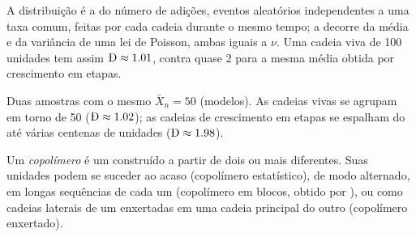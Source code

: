 \admitted

A distribuição é a do número de adições, eventos aleatórios independentes a uma taxa comum, feitas por
cada cadeia durante o mesmo tempo; a  decorre da média e da variância de uma lei de Poisson,
ambas iguais a $\nu$. Uma cadeia viva de 100 unidades tem assim $\text{\DH} \approx 1.01$, contra quase 2
para a mesma média obtida por crescimento em etapas.

\begin{omfigure}

{\small Duas amostras com o mesmo $\bar X_n = 50$ (modelos). As cadeias vivas se agrupam em torno de 50 ($\text{\DH}
\approx 1.02$); as cadeias de crescimento em etapas se espalham do  até várias centenas de
unidades ($\text{\DH} \approx
1.98$).}
\end{omfigure}

\begin{definition}[Copolímero]\label{def:b2:polymer-synthesis:copolymer}
Um \emph{copolímero} é um  construído a partir de dois ou mais  diferentes.
Suas unidades podem se suceder ao acaso (copolímero estatístico), de modo alternado, em longas
sequências de cada um (copolímero em blocos, obtido por ), ou como cadeias laterais de
um enxertadas em uma cadeia principal do outro (copolímero enxertado).
\end{definition}

